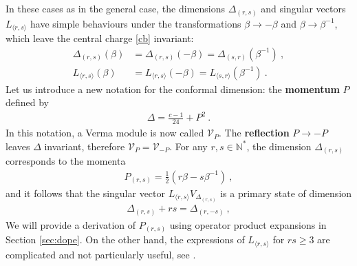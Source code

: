\documentclass[12pt, a4paper]{article}
\newcommand{\myindex}[1]{\textbf{\boldmath #1}}
\begin{document}
In these cases as in the general case, the dimensions $\Delta_{(r,s)}$ and singular vectors $L_{\langle r,s\rangle}$ have simple behaviours under the transformations $\beta\to -\beta$ and $\beta\to \beta^{-1}$, which leave the central charge \eqref{cb} invariant:
\begin{align}
 \Delta_{(r,s)}(\beta)&=\Delta_{(r,s)}(-\beta)=\Delta_{(s,r)}(\beta^{-1})\ ,
 \\
 L_{\langle r,s\rangle}(\beta)&=L_{\langle r,s\rangle}(-\beta)=L_{\langle s,r\rangle}(\beta^{-1})\ .
\end{align}
Let us introduce a new notation for the conformal dimension: the \myindex{momentum} $P$ defined by
\begin{align}
 \boxed{\Delta = \frac{c-1}{24} + P^2}\ .
 \label{dp}
\end{align}
In this notation, a Verma module is now called $\mathcal{V}_P$. The \myindex{reflection} $P\to -P$ leaves
$\Delta$ invariant, therefore $\mathcal{V}_P=\mathcal{V}_{-P}$. For any $r,s\in\mathbb{N}^*$, the dimension $\Delta_{(r, s)}$ corresponds to the momenta
\begin{align}
 \boxed{P_{(r, s)} = \frac12\left(r\beta -s\beta^{-1}\right)}\ ,
 \label{prs}
\end{align}
and it follows that the singular vector $L_{\langle r,s\rangle} V_{\Delta_{(r, s)}}$ is a primary state of dimension
\begin{align}
 \boxed{\Delta_{(r, s)} + rs = \Delta_{(r, -s)}}\ , 
 \label{drms}
\end{align}
We will provide a derivation of $P_{(r, s)}$ using operator product expansions in Section \ref{sec:dope}. On the other hand, the expressions of $L_{\langle r,s\rangle} $ for $rs\geq 3$ are complicated and not particularly useful, see \cite{wat24}.
\end{document}
